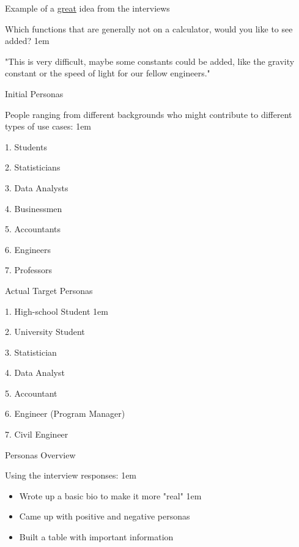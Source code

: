 \documentclass[12pt]{beamer}
\begin{document}
\begin{frame}{Example of a \underline{great} idea from the interviews}
    \item \textcolor{colorgreen}{Which functions that are generally not on a calculator, would you like to see added?} \pause
    \itemsep1em
    \item "This is very difficult, maybe some constants could be added, like the gravity constant or the speed of light for our fellow engineers."
\end{frame}

\begin{frame}{Initial Personas}
    \item People ranging from different backgrounds who might 
    contribute to different types of use cases: 
    \itemsep1em
    \item \textcolor{colorgreen}{1.} Students
    \item \textcolor{colorgreen}{2.} Statisticians
    \item \textcolor{colorgreen}{3.} Data Analysts
    \item \textcolor{colorgreen}{4.} Businessmen
    \item \textcolor{colorgreen}{5.} Accountants
    \item \textcolor{colorgreen}{6.} Engineers
    \item \textcolor{colorgreen}{7.} Professors
\end{frame}

\begin{frame}{Actual Target Personas}
    \item \textcolor{colorgreen}{1.} High-school Student
    \itemsep1em
    \item \textcolor{colorgreen}{2.} University Student
    \item \textcolor{colorgreen}{3.} Statistician
    \item \textcolor{colorgreen}{4.} Data Analyst
    \item \textcolor{colorgreen}{5.} Accountant
    \item \textcolor{colorgreen}{6.} Engineer (Program Manager)
    \item \textcolor{colorgreen}{7.} Civil Engineer
\end{frame}

\begin{frame}{Personas Overview}
    \item Using the interview responses: \pause
    \itemsep1em
    \item
    \begin{itemize}
        \item Wrote up a basic bio to make it more "real" \pause
        \itemsep1em
        \item Came up with positive and negative personas \pause
        \item Built a table with important information
    \end{itemize}
\end{frame}
\end{document}
